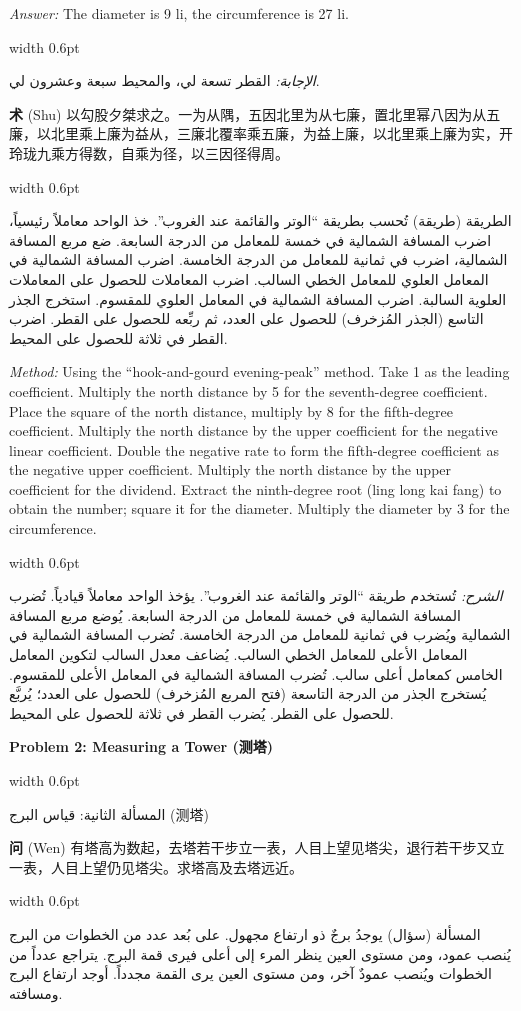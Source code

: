 \documentclass[11pt,a4paper]{article}
\newlength{\cnwidth}
\newlength{\arwidth}
\newcommand{\paralleltext}[2]{%
  \par\medskip\noindent
  \begin{minipage}[t]{\cnwidth}%
    \small #1%
  \end{minipage}%
  \hfill\textcolor{colrule}{\vrule width 0.6pt}\hfill
  \begin{minipage}[t]{\arwidth}%
    \small\arabicfont\beginR #2\endR%
  \end{minipage}%
  \par\medskip
}
\newcommand{\parallelsubsection}[2]{%
  \par\medskip\noindent
  \begin{minipage}[t]{\cnwidth}%
    \large\bfseries\color{sectioncolor} #1%
  \end{minipage}%
  \hfill\textcolor{colrule}{\vrule width 0.6pt}\hfill
  \begin{minipage}[t]{\arwidth}%
    \large\arabicfontbf\color{sectioncolor}\beginR #2\endR%
  \end{minipage}%
  \par\smallskip
}
\newcommand{\cnlabel}[1]{\textbf{\color{notecolor}#1}}
\newcommand{\arlabel}[1]{\arabicfontbf\color{notecolor}\beginR #1\endR}
\begin{document}
\paralleltext{%
\textit{Answer:} The diameter is 9 li, the circumference is 27 li.
}{%
\textit{الإجابة:} القطر تسعة لي، والمحيط سبعة وعشرون لي.
}

\paralleltext{%
\cnlabel{术} (Shu) 以勾股夕桀求之。一为从隅，五因北里为从七廉，置北里幂八因为从五廉，以北里乘上廉为益从，三廉北覆率乘五廉，为益上廉，以北里乘上廉为实，开玲珑九乘方得数，自乘为径，以三因径得周。
}{%
\arlabel{الطريقة} (طريقة) تُحسب بطريقة ``الوتر والقائمة عند الغروب''. خذ الواحد معاملاً رئيسياً، اضرب المسافة الشمالية في خمسة للمعامل من الدرجة السابعة. ضع مربع المسافة الشمالية، اضرب في ثمانية للمعامل من الدرجة الخامسة. اضرب المسافة الشمالية في المعامل العلوي للمعامل الخطي السالب. اضرب المعاملات للحصول على المعاملات العلوية السالبة. اضرب المسافة الشمالية في المعامل العلوي للمقسوم. استخرج الجذر التاسع (الجذر المُزخرف) للحصول على العدد، ثم ربِّعه للحصول على القطر. اضرب القطر في ثلاثة للحصول على المحيط.
}

\paralleltext{%
\textit{Method:} Using the ``hook-and-gourd evening-peak'' method. Take 1 as the leading coefficient. Multiply the north distance by 5 for the seventh-degree coefficient. Place the square of the north distance, multiply by 8 for the fifth-degree coefficient. Multiply the north distance by the upper coefficient for the negative linear coefficient. Double the negative rate to form the fifth-degree coefficient as the negative upper coefficient. Multiply the north distance by the upper coefficient for the dividend. Extract the ninth-degree root (ling long kai fang) to obtain the number; square it for the diameter. Multiply the diameter by 3 for the circumference.
}{%
\textit{الشرح:} تُستخدم طريقة ``الوتر والقائمة عند الغروب''. يؤخذ الواحد معاملاً قيادياً. تُضرب المسافة الشمالية في خمسة للمعامل من الدرجة السابعة. يُوضع مربع المسافة الشمالية ويُضرب في ثمانية للمعامل من الدرجة الخامسة. تُضرب المسافة الشمالية في المعامل الأعلى للمعامل الخطي السالب. يُضاعف معدل السالب لتكوين المعامل الخامس كمعامل أعلى سالب. تُضرب المسافة الشمالية في المعامل الأعلى للمقسوم. يُستخرج الجذر من الدرجة التاسعة (فتح المربع المُزخرف) للحصول على العدد؛ يُربَّع للحصول على القطر. يُضرب القطر في ثلاثة للحصول على المحيط.
}

\parallelsubsection{Problem 2: Measuring a Tower (测塔)}{المسألة الثانية: قياس البرج (测塔)}

\paralleltext{%
\cnlabel{问} (Wen) 有塔高为数起，去塔若干步立一表，人目上望见塔尖，退行若干步又立一表，人目上望仍见塔尖。求塔高及去塔远近。
}{%
\arlabel{المسألة} (سؤال) يوجدُ برجٌ ذو ارتفاع مجهول. على بُعد عدد من الخطوات من البرج يُنصب عمود، ومن مستوى العين ينظر المرء إلى أعلى فيرى قمة البرج. يتراجع عدداً من الخطوات ويُنصب عمودٌ آخر، ومن مستوى العين يرى القمة مجدداً. أوجد ارتفاع البرج ومسافته.
}
\end{document}
